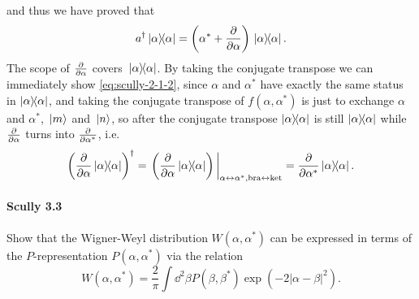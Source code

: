 \documentclass[hyperref, a4paper]{article}
\begin{document}
and thus we have proved that
\[
a^\dagger \dyad*{\alpha} = \left( \alpha^{*}+\frac{\partial}{\partial \alpha} \right) \dyad*{\alpha}.
\]
The scope of $\pdv{\alpha}$ covers $\dyad*{\alpha}$.
By taking the conjugate transpose we can immediately show \eqref{eq:scully-2-1-2}, since $\alpha$ and $\alpha^*$ have exactly the same status in $\dyad{\alpha}$, and taking the conjugate transpose of $f(\alpha, \alpha^*)$ is just to exchange $\alpha$ and $\alpha^*$, $\ket*{m}$ and $\ket*{n}$, so after the conjugate transpose $\dyad{\alpha}$ is still $\dyad{\alpha}$ while $\pdv{\alpha}$ turns into $\pdv{\alpha^*}$, i.e.
\[
    \left(\pdv{\alpha} \dyad{\alpha} \right)^\dagger = \eval{\left(\pdv{\alpha} \dyad{\alpha} \right)}_{\alpha \leftrightarrow \alpha^*, \text{bra} \leftrightarrow \text{ket}} = \pdv{\alpha^*} \dyad*{\alpha}.
\]

\paragraph{}

\paragraph{Scully 3.3} Show that the Wigner-Weyl distribution $W\left(\alpha, \alpha^{*}\right)$ can be expressed in terms of the $P$-representation $P\left(\alpha, \alpha^{*}\right)$ via the relation
\begin{equation}
    W\left(\alpha, \alpha^{*}\right)=\frac{2}{\pi} \int \dd^{2} \beta P\left(\beta, \beta^{*}\right) \exp \left(-2|\alpha-\beta|^{2}\right) .
    \label{eq:scully-3-3-1}
\end{equation}
\end{document}

